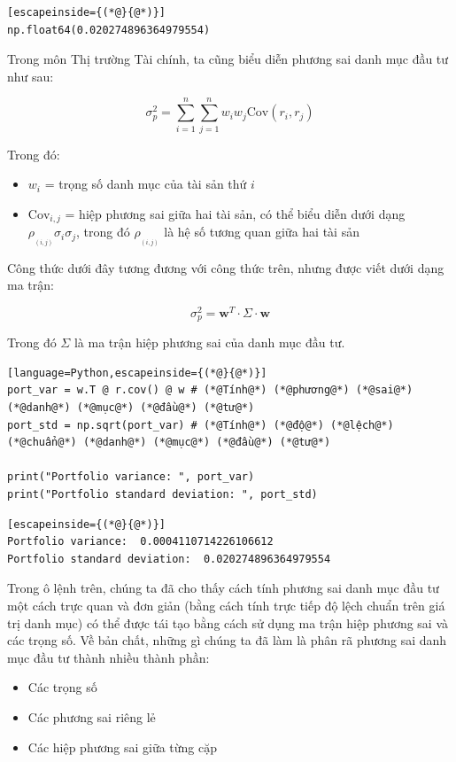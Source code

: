 \begin{lstlisting}[escapeinside={(*@}{@*)}]
np.float64(0.020274896364979554)
\end{lstlisting}

Trong môn Thị trường Tài chính, ta cũng biểu diễn phương sai danh mục đầu tư như sau:

$$
\sigma^{2}_{p} = \sum_{i=1}^{n} \sum_{j=1}^{n} w_i w_j \text{Cov}(r_i, r_j)
$$

Trong đó:

\begin{itemize}
  \item $w_i$ = trọng số danh mục của tài sản thứ $i$
  \item $\text{Cov}_{i,j}$ = hiệp phương sai giữa hai tài sản, có thể biểu diễn dưới dạng $\rho_{_{(i,j)}} \sigma_i \sigma_j$, trong đó $\rho_{_{(i,j)}}$ là hệ số tương quan giữa hai tài sản
\end{itemize}

Công thức dưới đây tương đương với công thức trên, nhưng được viết dưới dạng ma trận:

$$
\sigma^{2}_{p} = \mathbf{w}^{T} \cdot \Sigma \cdot \mathbf{w}
$$

Trong đó $\Sigma$ là ma trận hiệp phương sai của danh mục đầu tư.

\begin{lstlisting}[language=Python,escapeinside={(*@}{@*)}]
port_var = w.T @ r.cov() @ w # (*@Tính@*) (*@phương@*) (*@sai@*) (*@danh@*) (*@mục@*) (*@đầu@*) (*@tư@*)
port_std = np.sqrt(port_var) # (*@Tính@*) (*@độ@*) (*@lệch@*) (*@chuẩn@*) (*@danh@*) (*@mục@*) (*@đầu@*) (*@tư@*)

print("Portfolio variance: ", port_var)
print("Portfolio standard deviation: ", port_std)
\end{lstlisting}

\begin{lstlisting}[escapeinside={(*@}{@*)}]
Portfolio variance:  0.0004110714226106612
Portfolio standard deviation:  0.020274896364979554
\end{lstlisting}

Trong ô lệnh trên, chúng ta đã cho thấy cách tính phương sai danh mục đầu tư một cách trực quan và đơn giản (bằng cách tính trực tiếp độ lệch chuẩn trên giá trị danh mục) có thể được tái tạo bằng cách sử dụng ma trận hiệp phương sai và các trọng số. Về bản chất, những gì chúng ta đã làm là phân rã phương sai danh mục đầu tư thành nhiều thành phần:
\begin{itemize}
  \item Các trọng số
  \item Các phương sai riêng lẻ
  \item Các hiệp phương sai giữa từng cặp
\end{itemize}

